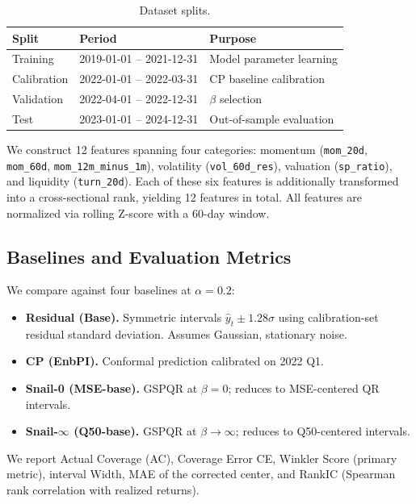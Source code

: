 \documentclass[12pt, a4paper]{article}
\begin{document}
\begin{table}[h]
\centering
\caption{Dataset splits.}
\label{tab:splits}
\begin{tabular}{lll}
\toprule
Split & Period & Purpose \\
\midrule
Training    & 2019-01-01 -- 2021-12-31 & Model parameter learning \\
Calibration & 2022-01-01 -- 2022-03-31 & CP baseline calibration \\
Validation  & 2022-04-01 -- 2022-12-31 & $\beta$ selection \\
Test        & 2023-01-01 -- 2024-12-31 & Out-of-sample evaluation \\
\bottomrule
\end{tabular}
\end{table}

We construct 12 features spanning four categories: momentum (\texttt{mom\_20d},
\texttt{mom\_60d}, \texttt{mom\_12m\_minus\_1m}), volatility (\texttt{vol\_60d\_res}),
valuation (\texttt{sp\_ratio}), and liquidity (\texttt{turn\_20d}). Each of these six
features is additionally transformed into a cross-sectional rank, yielding 12 features
in total. All features are normalized via rolling Z-score with a 60-day window.

\subsection{Baselines and Evaluation Metrics}

We compare against four baselines at $\alpha = 0.2$:
\begin{itemize}
    \item \textbf{Residual (Base).} Symmetric intervals $\hat{y}_t \pm 1.28\sigma$
    using calibration-set residual standard deviation. Assumes Gaussian, stationary noise.
    \item \textbf{CP (EnbPI).} Conformal prediction \citep{xu2021} calibrated on
    2022 Q1.
    \item \textbf{Snail-0 (MSE-base).} GSPQR at $\beta = 0$; reduces to MSE-centered
    QR intervals.
    \item \textbf{Snail-$\infty$ (Q50-base).} GSPQR at $\beta \to \infty$; reduces to
    Q50-centered intervals.
\end{itemize}

We report Actual Coverage (AC), Coverage Error CE, Winkler Score (primary metric),
interval Width, MAE of the corrected center, and RankIC (Spearman rank correlation
with realized returns).
\end{document}

